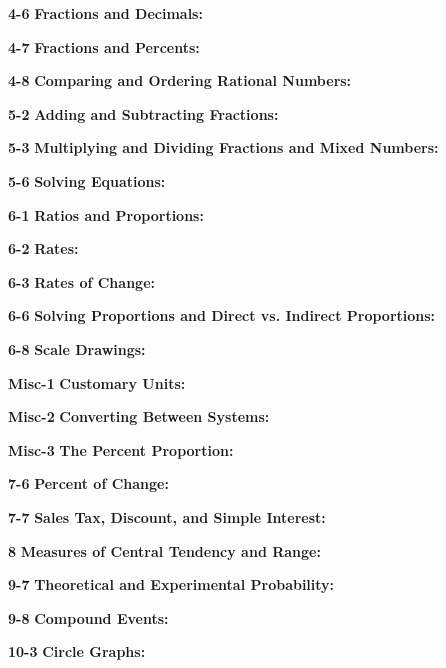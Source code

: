 \begin{enumerate*}
		\item[\Large\textbf{4-6}] \Large\textbf{Fractions and Decimals:}\\
		\item[\Large\textbf{4-7}] \Large\textbf{Fractions and Percents:}\\
		\item[\Large\textbf{4-8}] \Large\textbf{Comparing and Ordering Rational Numbers:}\\
		\item[\Large\textbf{5-2}] \Large\textbf{Adding and Subtracting Fractions:}\\
		\item[\Large\textbf{5-3}] \Large\textbf{Multiplying and Dividing Fractions and Mixed Numbers:}\\
		\item[\Large\textbf{5-6}] \Large\textbf{Solving Equations:}\\
		\item[\Large\textbf{6-1}] \Large\textbf{Ratios and Proportions:}\\
		\item[\Large\textbf{6-2}] \Large\textbf{Rates:}\\
		\item[\Large\textbf{6-3}] \Large\textbf{Rates of Change:}\\
		\item[\Large\textbf{6-6}] \Large\textbf{Solving Proportions and Direct vs. Indirect Proportions:}\\
		\item[\Large\textbf{6-8}] \Large\textbf{Scale Drawings:}\\
		\item[\Large\textbf{Misc-1}] \Large\textbf{Customary Units:}\\
		\item[\Large\textbf{Misc-2}] \Large\textbf{Converting Between Systems:}\\
		\item[\Large\textbf{Misc-3}] \Large\textbf{The Percent Proportion:}\\
		\item[\Large\textbf{7-6}] \Large\textbf{Percent of Change:}\\
		\item[\Large\textbf{7-7}] \Large\textbf{Sales Tax, Discount, and Simple Interest:}\\
		\item[\Large\textbf{8}] \Large\textbf{Measures of Central Tendency and Range:}\\
		\item[\Large\textbf{9-7}] \Large\textbf{Theoretical and Experimental Probability:}\\
		\item[\Large\textbf{9-8}] \Large\textbf{Compound Events:}\\
		\item[\Large\textbf{10-3}] \Large\textbf{Circle Graphs:}\\

	\end{enumerate*}